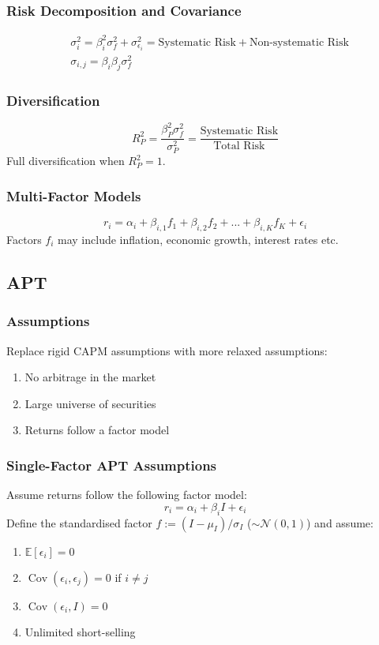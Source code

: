\documentclass[11pt]{article}
\newcommand{\E}{\mathbb{E}}
\newcommand{\Cov}{\operatorname{Cov}}
\begin{document}
	\subsubsection{Risk Decomposition and Covariance}
	\begin{align*}
	& \sigma_i^2 = \beta_i^2 \sigma_f^2 + \sigma_{\epsilon_{i}}^2 = \text{Systematic Risk} + \text{Non-systematic Risk}\\
	& \sigma_{i, j} = \beta_i \beta_j \sigma_f^2
	\end{align*}
	\subsubsection{Diversification}	
	\[	R_P^2 = \frac{\beta_P^2 \sigma_f^2}{\sigma_P^2} = \frac{\text{Systematic Risk}}{\text{Total Risk}}\]
	Full diversification when \( R_P^2 = 1 \).
	\subsubsection{Multi-Factor Models}
	\[	r_i = \alpha_i + \beta_{i, 1}f_1 + \beta_{i, 2}f_2 + ... + \beta_{i, K} f_K + \epsilon_i \]
	Factors \( f_i \) may include inflation, economic growth, interest rates etc.
	\subsection{APT}
	\subsubsection{Assumptions}
	Replace rigid CAPM assumptions with more relaxed assumptions:
	\begin{enumerate}
		\item No arbitrage in the market
		\item Large universe of securities
		\item Returns follow a factor model
	\end{enumerate}
	\subsubsection{Single-Factor APT Assumptions}
	Assume returns follow the following factor model:
		\[	r_i = \alpha_i + \beta_{i}I+\epsilon_{i}\]
	Define the standardised factor \( f:=(I - \mu_{I})/\sigma_{I} \) (\( \sim\mathcal{N}(0,1) \)) and assume:
	\begin{enumerate}
		\item \( \E[\epsilon_i] = 0 \)
		\item \( \Cov(\epsilon_i, \epsilon_j) = 0\) if \( i\neq j \)
		\item \( \Cov(\epsilon_i, I) = 0\)
		\item Unlimited short-selling
	\end{enumerate}
\end{document}
